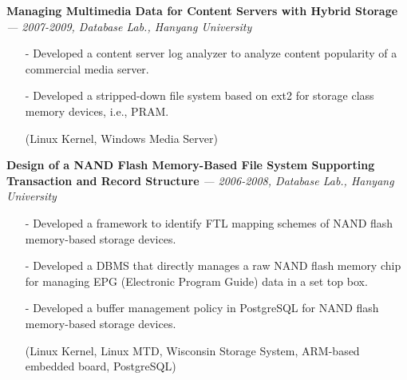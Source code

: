   \vspace{-0.15in}
  {\bf Managing Multimedia Data for Content Servers with Hybrid Storage}
    {\it \footnotesize --- 2007-2009, Database Lab., Hanyang University}
    \begin{itemize}[leftmargin=*]
    \setlength\itemsep{-0.02in}
    \item[-] Developed a content server log analyzer to analyze content popularity
             of a commercial media server.
    \item[-] Developed a stripped-down file system based on ext2
             for storage class memory devices, i.e., PRAM.
    \item[] {\small(Linux Kernel, Windows Media Server)}
    \end{itemize}
  \vspace{-0.15in}
  {\bf Design of a NAND Flash Memory-Based File System Supporting Transaction and
      Record Structure} 
    {\it \footnotesize --- 2006-2008, Database Lab., Hanyang University}
    \begin{itemize}[leftmargin=*]
    \setlength\itemsep{-0.02in}
    \item[-] Developed a framework to identify FTL mapping schemes of NAND flash memory-based
             storage devices.
    \item[-] Developed a DBMS that directly manages a raw NAND flash memory chip
             for managing EPG (Electronic Program Guide) data in a set top box.
    \item[-] Developed a buffer management policy in PostgreSQL for NAND flash
             memory-based storage devices.
    \item[] {\small(Linux Kernel, Linux MTD, Wisconsin Storage System, ARM-based embedded
     board, PostgreSQL)}
    \end{itemize}

